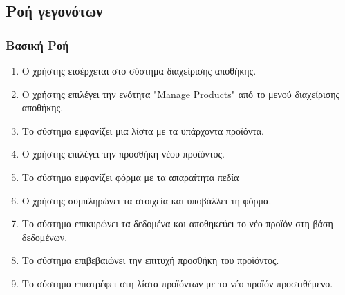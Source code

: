 \documentclass[12pt,a4paper,twoside]{book}
\begin{document}
\subsection{Ροή γεγονότων}

\subsubsection{Βασική Ροή}
\begin{enumerate}
  \item Ο χρήστης εισέρχεται στο σύστημα διαχείρισης αποθήκης. %
  \item Ο χρήστης επιλέγει την ενότητα "Manage Products" από το μενού διαχείρισης αποθήκης. %
  \item Το σύστημα εμφανίζει μια λίστα με τα υπάρχοντα προϊόντα.
  \item Ο χρήστης επιλέγει την προσθήκη νέου προϊόντος.
  \item Το σύστημα εμφανίζει φόρμα με τα απαραίτητα πεδία %
  \item Ο χρήστης συμπληρώνει τα στοιχεία και υποβάλλει τη φόρμα.
  \item Το σύστημα επικυρώνει τα δεδομένα και αποθηκεύει το νέο προϊόν στη βάση δεδομένων. %
  \item Το σύστημα επιβεβαιώνει την επιτυχή προσθήκη του προϊόντος.
  \item Το σύστημα επιστρέφει στη λίστα προϊόντων με το νέο προϊόν προστιθέμενο.
\end{enumerate}
\end{document}
